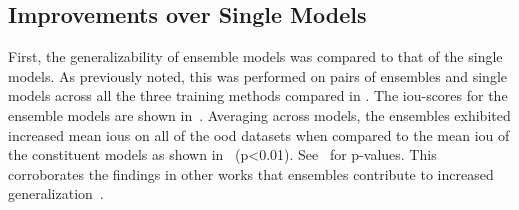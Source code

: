 \subsection{Improvements over Single Models}\label{ensemble_improvement_section}
First, the generalizability of ensemble models was compared to that of the single models. As previously noted, this was performed on pairs of ensembles and single models across all the three training methods compared in . The \gls{iou}-scores for the ensemble models are shown in~. Averaging across models, the ensembles exhibited increased mean \glspl{iou} on all of the \gls{ood} datasets when compared to the mean \gls{iou} of the constituent models as shown in~ (p<0.01). See~ for p-values. This corroborates the findings in other works that ensembles contribute to increased generalization~\cite{endoensemble, divergentnets}. 
